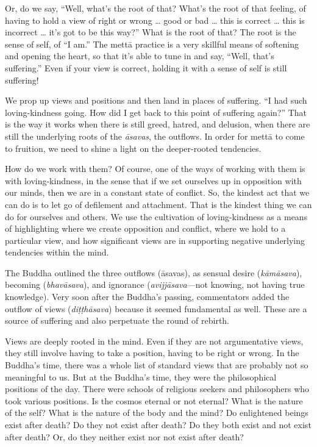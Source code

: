 Or, do we say, “Well, what’s the root of that? What’s the root of that
feeling, of having to hold a view of right or wrong \ldots{} good or bad \ldots{}
this is correct \ldots{} this is incorrect \ldots{} it’s got to be this way?” What
is the root of that? The root is the sense of self, of “I am.” The mettā
practice is a very skillful means of softening and opening the heart, so
that it’s able to tune in and say, “Well, that’s suffering.” Even if
your view is correct, holding it with a sense of self is still
suffering!

We prop up views and positions and then land in places of suffering. “I
had such loving-kindness going. How did I get back to this point of
suffering again?” That is the way it works when there is still greed,
hatred, and delusion, when there are still the underlying roots of the
\emph{āsavas}, the outflows. In order for mettā to come to fruition, we
need to shine a light on the deeper-rooted tendencies.

How do we work with them? Of course, one of the ways of working with
them is with loving-kindness, in the sense that if we set ourselves up
in opposition with our minds, then we are in a constant state of
conflict. So, the kindest act that we can do is to let go of defilement
and attachment. That is the kindest thing we can do for ourselves and
others. We use the cultivation of loving-kindness as a means of
highlighting where we create opposition and conflict, where we hold to a
particular view, and how significant views are in supporting negative
underlying tendencies within the mind.

The Buddha outlined the three outflows (āsavas), as sensual desire
(\emph{kāmāsava}), becoming (\emph{bhavāsava}), and ignorance
(\emph{avijjāsava}—not knowing, not having true knowledge). Very soon
after the Buddha’s passing, commentators added the outflow of views
(\emph{diṭṭhāsava}) because it seemed fundamental as well. These are a
source of suffering and also perpetuate the round of rebirth.

Views are deeply rooted in the mind. Even if they are not argumentative
views, they still involve having to take a position, having to be right
or wrong. In the Buddha’s time, there was a whole list of standard views
that are probably not so meaningful to us. But at the Buddha’s time,
they were the philosophical positions of the day. There were schools of
religious seekers and philosophers who took various positions. Is the
cosmos eternal or not eternal? What is the nature of the self? What is
the nature of the body and the mind? Do enlightened beings exist after
death? Do they not exist after death? Do they both exist and not exist
after death? Or, do they neither exist nor not exist after death?

